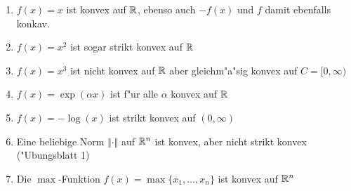 \begin{enumerate}[label=\emph{\alph*})]
	\item $f(x) = x$ ist konvex auf $\mathbb R$, ebenso auch $-f(x)$ und $f$ damit ebenfalls konkav.
	\item $f(x) = x^2$ ist sogar strikt konvex auf $\mathbb R$ %
	\item $f(x) = x^3$ ist nicht konvex auf $\mathbb R$ aber gleichm"a"sig konvex auf $C = [0, \infty)$
	\item $f(x) = \exp(\alpha x)$ ist f"ur alle $\alpha$ konvex auf $\mathbb R$
	\item $f(x) = -\log(x)$ ist strikt konvex auf $(0, \infty)$
	\item Eine beliebige Norm $\Vert\cdot\Vert$ auf $\mathbb R^n$ ist konvex, aber nicht strikt konvex ("Ubungsblatt 1)
	\item Die $\max$-Funktion $f(x) = \max \lbrace x_1, \ldots, x_n \rbrace$ ist konvex auf $\mathbb R^n$
\end{enumerate}
